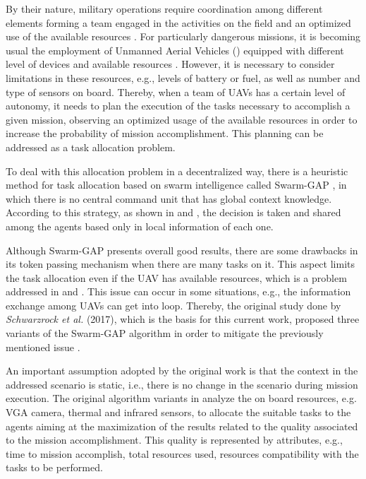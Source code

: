 By their nature, military operations require coordination among different elements forming a team engaged in the activities on the field and an optimized use of the available resources \cite{CC01}. For particularly dangerous missions, it is becoming usual the employment  of Unmanned Aerial Vehicles (\uav) equipped with different level of devices and available resources \cite{nonami2010autonomous} \cite{UAV01}. However, it is necessary to consider limitations in these resources, e.g., levels of battery or fuel, as well as number and type of sensors on board. Thereby, when a team of UAVs has a certain level of autonomy, it needs to plan the execution of the tasks necessary to accomplish a given mission, observing an optimized usage of the available resources in order to increase the probability of mission accomplishment. This planning can be addressed as a task allocation problem.

To deal with this allocation problem in a decentralized way, there is a heuristic method for task allocation based on swarm intelligence called Swarm-GAP \cite{ferreira2007swarm}, in which there is no central command unit that has global context knowledge. According to this strategy, as shown in \cite{MOEA07} and \cite{MOEA05}, the decision is taken and shared among the agents based only in local information of each one.

Although Swarm-GAP presents overall good results, there are some drawbacks in its token passing mechanism when there are many tasks on it. This aspect limits the task allocation even if the UAV has available resources, which is a problem addressed in \cite{MOEA07} and \cite{MAS07}. This issue can occur in some situations, e.g., the information exchange among UAVs can get into loop. Thereby, the original study done by \textit{Schwarzrock et al.} (2017)\cite{MAS07}, which is the basis for this current work, proposed three variants of the Swarm-GAP algorithm in order to mitigate the previously mentioned issue .

An important assumption adopted by the original work is that the context in the addressed scenario is static, i.e., there is no change in the scenario during mission execution. The original algorithm variants in \cite{MAS07} analyze the on board resources, e.g. VGA camera, thermal and infrared sensors, to allocate the suitable tasks to the agents aiming at the maximization of the results related to the quality associated to the mission accomplishment. This quality is represented by attributes, e.g., time to mission accomplish, total resources used, resources compatibility with the tasks to be performed.

